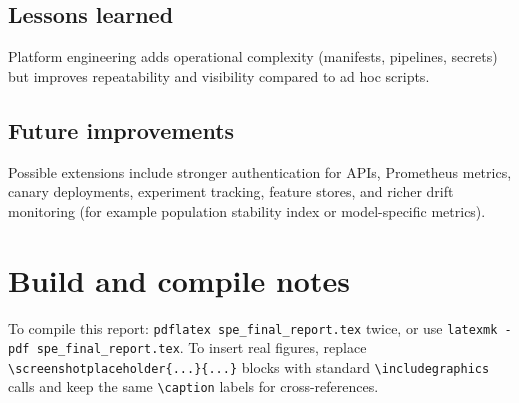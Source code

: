 \documentclass[11pt,a4paper,oneside]{report}
\newcommand{\screenshotplaceholder}[2]{%
  \begin{center}
    \fbox{%
      \parbox[c][0.22\textheight][c]{0.92\linewidth}{%
        \centering\small\textit{[Screenshot placeholder: #1]}\\[0.5em]
        #2%
      }%
    }%
  \end{center}%
}
\begin{document}
\section{Lessons learned}
Platform engineering adds operational complexity (manifests, pipelines, secrets) but improves repeatability and visibility compared to ad hoc scripts.

\section{Future improvements}
Possible extensions include stronger authentication for APIs, Prometheus metrics, canary deployments, experiment tracking, feature stores, and richer drift monitoring (for example population stability index or model-specific metrics).

\appendix
\chapter{Build and compile notes}
To compile this report: \texttt{pdflatex spe\_final\_report.tex} twice, or use \texttt{latexmk -pdf spe\_final\_report.tex}. To insert real figures, replace \verb|\screenshotplaceholder{...}{...}| blocks with standard \verb|\includegraphics| calls and keep the same \verb|\caption| labels for cross-references.
\end{document}

